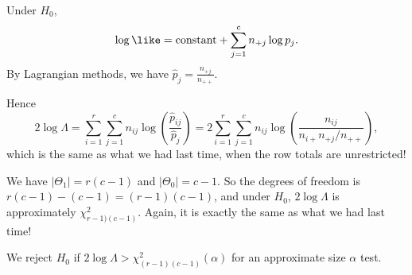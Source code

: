 \documentclass[a4paper]{article}
\begin{document}
Under $H_0$,
\[
  \log\like = \text{constant} + \sum_{j = 1}^c n_{+j}\log p_j.
\]
By Lagrangian methods, we have $\hat{p}_j = \frac{n_{+j}}{n_{++}}$.

Hence
\[
  2\log \Lambda = \sum_{i = 1}^{r}\sum_{j = 1}^c n_{ij}\log\left(\frac{\hat{p}_{ij}}{\hat{p}_j}\right) = 2\sum_{i = 1}^r\sum_{j = 1}^c n_{ij}\log\left(\frac{n_{ij}}{n_{i+}n_{+j}/n_{++}}\right),
\]
which is the same as what we had last time, when the row totals are unrestricted!

We have $|\Theta_1| = r(c - 1)$ and $|\Theta_0| = c - 1$. So the degrees of freedom is $r(c - 1) - (c - 1) = (r - 1)(c - 1)$, and under $H_0$, $2\log\Lambda$ is approximately $\chi^2_{r - 1)(c - 1)}$. Again, it is exactly the same as what we had last time!

We reject $H_0$ if $2\log \Lambda > \chi_{(r - 1)(c - 1)}^2 (\alpha)$ for an approximate size $\alpha$ test.
\end{document}
